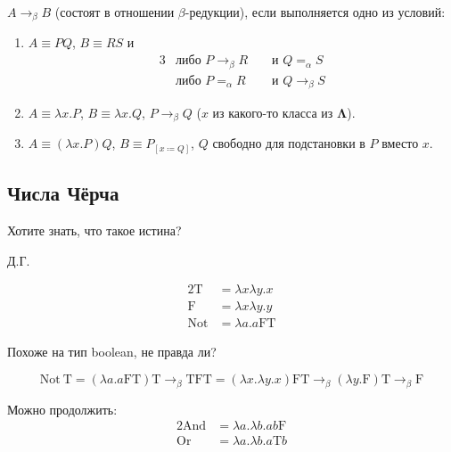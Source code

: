 \begin{definition}
    $A\rightarrow_{\beta}B$ (состоят в отношении $\beta$-редукции), если выполняется одно из условий:
    \begin{enumerate}
        \item $A\equiv{}PQ$, $B\equiv{}RS$ и
        \begin{alignat*}{3}
            &\text{либо } P\rightarrow_{\beta}R  &&\text{ и } Q=_{\alpha}S \\
            &\text{либо } P=_{\alpha}R           &&\text{ и } Q\rightarrow_{\beta}S
        \end{alignat*}
        \item $A\equiv{}\lambda{}x.P$, $B\equiv{}\lambda{}x.Q$, $P\rightarrow_{\beta}Q$ ($x$ из какого-то класса из $\bm{\Lambda}$).
        \item $A\equiv{}(\lambda{}x.P)Q$, $B\equiv{}P_{[x\coloneqq{}Q]}$, $Q$ свободно для подстановки в $P$ вместо $x$.
    \end{enumerate}
\end{definition}

\subsection{\texorpdfstring{Числа Чёрча}{Church numerals}}
\epigraph{Хотите знать, что такое истина?}{Д.Г.}

\newcommand{\T}{\mathrm{T}}
\newcommand{\F}{\mathrm{F}}
\newcommand{\Not}{\mathrm{Not}}
\begin{alignat*}{2}
    \T   &= \lambda{}x\lambda{}y.x \\
    \F   &= \lambda{}x\lambda{}y.y \\
    \Not &= \lambda{}a.a\F\T
\end{alignat*}

Похоже на тип boolean, не правда ли?
\begin{example}
    \[
        \Not\ \T = (\lambda{}a.a\F\T)\T \rightarrow_{\beta}
            \T\F\T = (\lambda{}x.\lambda{}y.x)\F\T \rightarrow_{\beta}
            (\lambda{}y.\F)\T \rightarrow_{\beta}
            \F
    \]
\end{example}

Можно продолжить:
\begin{alignat*}{2}
    \mathrm{And} &= \lambda{}a.\lambda{}b.ab\mathrm{F} \\
    \mathrm{Or}  &= \lambda{}a.\lambda{}b.a\mathrm{T}b
\end{alignat*}

